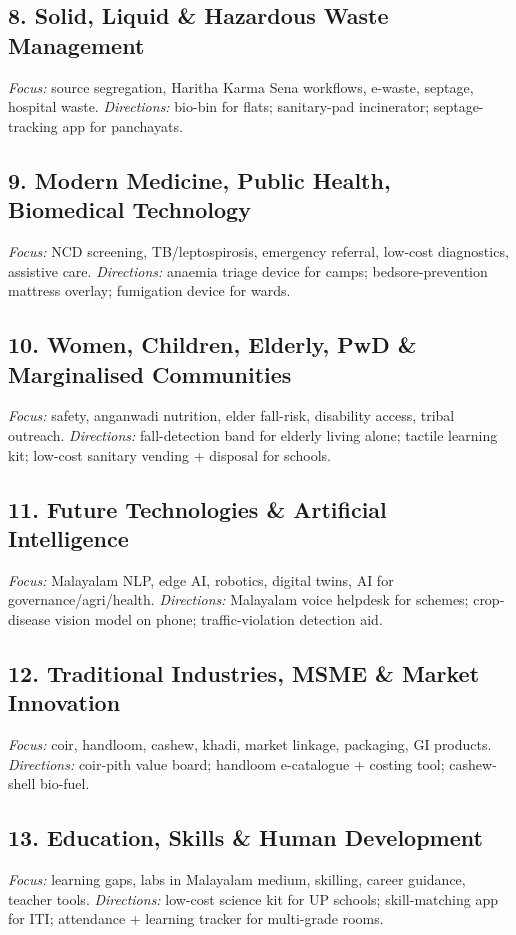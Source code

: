 \documentclass[11pt,a4paper]{article}
\begin{document}
\subsection{8. Solid, Liquid \& Hazardous Waste Management}
\textit{Focus:} source segregation, Haritha Karma Sena workflows, e-waste, septage, hospital waste. \textit{Directions:} bio-bin for flats; sanitary-pad incinerator; septage-tracking app for panchayats.

\subsection{9. Modern Medicine, Public Health, Biomedical Technology}
\textit{Focus:} NCD screening, TB/leptospirosis, emergency referral, low-cost diagnostics, assistive care. \textit{Directions:} anaemia triage device for camps; bedsore-prevention mattress overlay; fumigation device for wards.

\subsection{10. Women, Children, Elderly, PwD \& Marginalised Communities}
\textit{Focus:} safety, anganwadi nutrition, elder fall-risk, disability access, tribal outreach. \textit{Directions:} fall-detection band for elderly living alone; tactile learning kit; low-cost sanitary vending + disposal for schools.

\subsection{11. Future Technologies \& Artificial Intelligence}
\textit{Focus:} Malayalam NLP, edge AI, robotics, digital twins, AI for governance/agri/health. \textit{Directions:} Malayalam voice helpdesk for schemes; crop-disease vision model on phone; traffic-violation detection aid.

\subsection{12. Traditional Industries, MSME \& Market Innovation}
\textit{Focus:} coir, handloom, cashew, khadi, market linkage, packaging, GI products. \textit{Directions:} coir-pith value board; handloom e-catalogue + costing tool; cashew-shell bio-fuel.

\subsection{13. Education, Skills \& Human Development}
\textit{Focus:} learning gaps, labs in Malayalam medium, skilling, career guidance, teacher tools. \textit{Directions:} low-cost science kit for UP schools; skill-matching app for ITI; attendance + learning tracker for multi-grade rooms.
\end{document}
